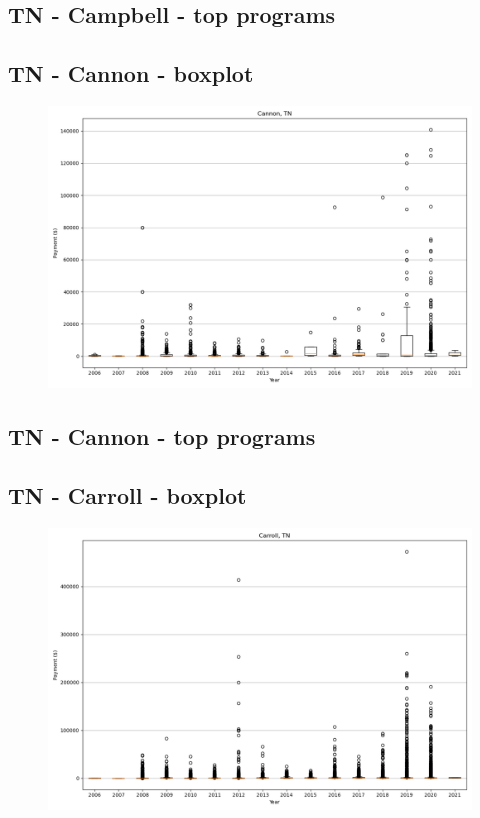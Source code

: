 \subsection*{TN - Campbell - top programs}

\newpage
\subsection*{TN - Cannon - boxplot}
\begin{figure}[h]
\centering
\includegraphics[width=7in]{../output/boxplots/counties/Cannon-TN_boxplot.png}
\end{figure}


\subsection*{TN - Cannon - top programs}

\newpage
\subsection*{TN - Carroll - boxplot}
\begin{figure}[h]
\centering
\includegraphics[width=7in]{../output/boxplots/counties/Carroll-TN_boxplot.png}
\end{figure}



